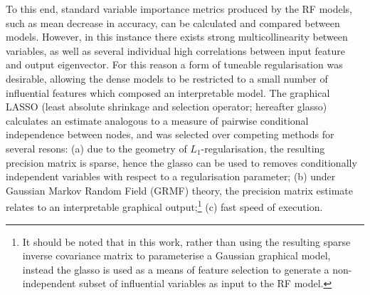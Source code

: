 \documentclass[a4paper]{report}
\begin{document}
To this end, standard variable importance metrics produced by the RF models,
such as mean decrease in accuracy, can be calculated and compared
between models. However, in this instance there exists strong
multicollinearity between variables, as well as several individual
high correlations between input feature and output eigenvector. For
this reason a form of tuneable regularisation was desirable, allowing
the dense models to be restricted to a small number of influential
features which composed an interpretable model. The graphical LASSO\cite{Friedman2008}
(least absolute shrinkage and selection operator; hereafter glasso)
calculates an estimate analogous to a measure of pairwise conditional
independence between nodes,\cite{Menendez2010} and was selected over competing methods for
several resons: {\small (a)} due to the geometry of
$L_1$-regularisation, the resulting precision matrix is sparse, hence
the glasso can be used to removes conditionally independent variables with respect to a
regularisation parameter; {\small (b)} under Gaussian Markov Random
Field (GRMF) theory, the precision matrix estimate relates to an
interpretable graphical output;\footnote{It should be noted that
in this work, rather than using the resulting sparse inverse
covariance matrix to parameterise a Gaussian graphical model, instead
the glasso is used as a means of feature selection to generate a
non-independent subset of influential variables as input to the RF
model.}  {\small (c)} fast speed of execution.\cite{Hastie2001, Friedman2008} \\
\end{document}
